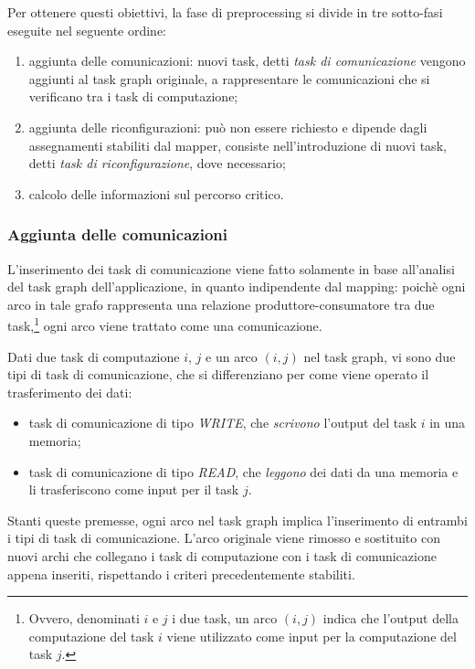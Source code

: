 Per ottenere questi obiettivi, la fase di preprocessing si divide in tre 
sotto-fasi eseguite nel seguente ordine:
\begin{enumerate}
 \item aggiunta delle comunicazioni: nuovi task, detti \emph{task di 
comunicazione} vengono aggiunti al task graph originale, a rappresentare le 
comunicazioni che si verificano tra i task di computazione;
 \item aggiunta delle riconfigurazioni: può non essere richiesto e dipende 
dagli assegnamenti stabiliti dal mapper, consiste nell'introduzione di nuovi 
task, detti \emph{task di riconfigurazione}, dove necessario;
 \item calcolo delle informazioni sul percorso critico.
\end{enumerate}

\subsubsection{Aggiunta delle comunicazioni}
L'inserimento dei task di comunicazione viene fatto solamente in base 
all'analisi del task graph dell'applicazione, in quanto indipendente dal 
mapping: poichè ogni arco in tale grafo rappresenta una relazione 
produttore-consumatore tra due task,\footnote{Ovvero, denominati $i$ e $j$ i due 
task, un arco $(i,j)$ indica che l'output della computazione del task $i$ viene 
utilizzato come input per la computazione del task $j$.} ogni arco viene 
trattato come una comunicazione.

Dati due task di computazione $i$, $j$ e un 
arco $(i,j)$ nel task graph, vi sono due tipi di task di comunicazione, che si 
differenziano per come viene operato il trasferimento dei dati:
\begin{itemize}
 \item task di comunicazione di tipo \emph{WRITE}, che \emph{scrivono} 
l'output del task $i$ in una memoria;
 \item task di comunicazione di tipo \emph{READ}, che \emph{leggono} dei dati 
da una memoria e li trasferiscono come input per il task $j$. 
\end{itemize}
Stanti queste premesse, ogni arco nel task graph implica l'inserimento di 
entrambi i tipi di task di comunicazione. L'arco originale viene rimosso e 
sostituito con nuovi archi che collegano i task di computazione con i task di 
comunicazione appena inseriti, rispettando i criteri precedentemente stabiliti.


